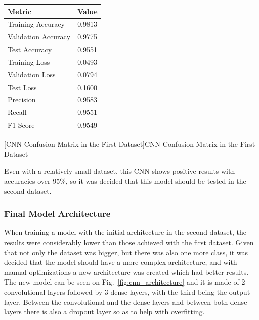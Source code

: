 \begin{minipage}{0.35\textwidth}
    \label{table:cnn_dataset1_results}
    \centering
    \begin{tabular}{ |p{3.4cm}|p{1.1cm}| }
    \hline
    Metric & Value \\
    \hline
    Training Accuracy & 0.9813 \\
    \hline
    Validation Accuracy & 0.9775 \\
    \hline
    Test Accuracy & 0.9551 \\
    \hline
    Training Loss & 0.0493 \\
    \hline
    Validation Loss & 0.0794 \\
    \hline
    Test Loss & 0.1600 \\
    \hline
    Precision & 0.9583 \\
    \hline
    Recall & 0.9551 \\
    \hline
    F1-Score & 0.9549 \\
    \hline
    \end{tabular}
\end{minipage}%
\begin{minipage}{0.65\textwidth}
    \centering
    
    [CNN Confusion Matrix in the First Dataset]{CNN Confusion Matrix in the First Dataset}
    \label{fig:cnn_confusion_matrix}
\end{minipage}

\kern 0.1cm

Even with a relatively small dataset, this CNN shows positive results with accuracies over 95\%, so it was decided that this model should be tested in the second dataset.

\subsubsection{Final Model Architecture}

When training a model with the initial architecture in the second dataset, the results were considerably lower than those achieved with the first dataset. Given that not only the dataset was bigger, but there was also one more class, it was decided that the model should have a more complex architecture, and with manual optimizations a new architecture was created which had better results. The new model can be seen on Fig.~\ref{fig:cnn_architecture} and it is made of 2 convolutional layers followed by 3 dense layers, with the third being the output layer. Between the convolutional and the dense layers and between both dense layers there is also a dropout layer so as to help with overfitting.

